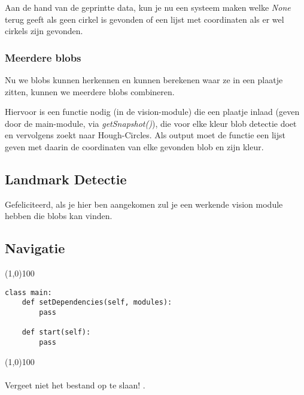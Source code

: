 \documentclass[a4paper]{article}
\begin{document}
Aan de hand van de geprintte data, kun je nu een systeem maken welke \textit{None} terug geeft als geen cirkel is gevonden of een lijst met coordinaten als er wel cirkels zijn gevonden.

\subsubsection{Meerdere blobs}
Nu we blobs kunnen herkennen en kunnen berekenen waar ze in een plaatje zitten, kunnen we meerdere blobs combineren.

Hiervoor is een functie nodig (in de vision-module) die een plaatje inlaad (geven door de main-module, via \textit{getSnapshot()}), die voor elke kleur blob detectie doet en vervolgens zoekt  naar Hough-Circles. Als output moet de functie een lijst geven met daarin de coordinaten van elke gevonden blob en zijn kleur.

\subsection{Landmark Detectie}
Gefeliciteerd, als je hier ben aangekomen zul je een werkende vision module hebben die blobs kan vinden.




\subsection{Navigatie}




\noindent \line(1,0){100}
\begin{verbatim}
class main:
    def setDependencies(self, modules):
        pass

    def start(self):
        pass
\end{verbatim}
\noindent \line(1,0){100}
\\\\
Vergeet niet het bestand op te slaan!
.
\end{document}
